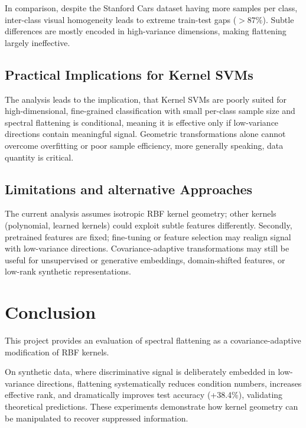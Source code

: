 \documentclass{article}
\begin{document}
In comparison, despite the Stanford Cars dataset having more samples per class, inter-class visual homogeneity leads to extreme train-test gaps ($>87\%$). Subtle differences are mostly encoded in high-variance dimensions, making flattening largely ineffective. 

\subsection{Practical Implications for Kernel SVMs}

The analysis leads to the implication, that Kernel SVMs are poorly suited for high-dimensional, fine-grained classification with small per-class sample size and spectral flattening is conditional, meaning it is effective only if low-variance directions contain meaningful signal. Geometric transformations alone cannot overcome overfitting or poor sample efficiency, more generally speaking, data quantity is critical.

\subsection{Limitations and alternative Approaches}

The current analysis assumes isotropic RBF kernel geometry; other kernels (polynomial, learned kernels) could exploit subtle features differently. Secondly, pretrained features are fixed; fine-tuning or feature selection may realign signal with low-variance directions. Covariance-adaptive transformations may still be useful for unsupervised or generative embeddings, domain-shifted features, or low-rank synthetic representations.

\section{Conclusion}

This project provides an evaluation of spectral flattening as a covariance-adaptive modification of RBF kernels.  

On synthetic data, where discriminative signal is deliberately embedded in low-variance directions, flattening systematically reduces condition numbers, increases effective rank, and dramatically improves test accuracy (+38.4\%), validating theoretical predictions. These experiments demonstrate how kernel geometry can be manipulated to recover suppressed information.  
\end{document}
